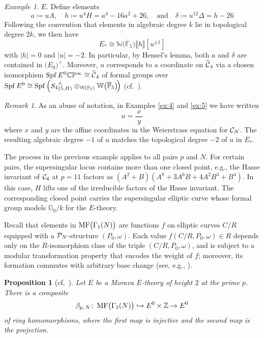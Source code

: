 \documentclass{gtpart}
\newtheorem{prop}[equation]{Proposition}
\theoremstyle{definition}
\theoremstyle{remark}
\newtheorem{rmk}[equation]{Remark}
\newtheorem{ex}[equation]{Example}
\def\co{\colon\thinspace}
\newcommand{\mb}[1]{\mathbb{#1}}
\newcommand{\Spf}{{\rm Spf\thinspace}}
\newcommand{\cF}{\overline {\mb F}}
\newcommand{\CC}{{\cal C}}
\newcommand{\CP}{{\cal P}}
\newcommand{\BC}{{\mb C}}
\newcommand{\BF}{{\mb F}}
\newcommand{\BG}{{\mb G}}
\newcommand{\BP}{{\mb P}}
\newcommand{\BW}{{\mb W}}
\newcommand{\BZ}{{\mb Z}}
\newcommand{\HCC}{\widehat{~\!\!\CC}}
\newcommand{\ad}{\text{and}}
\newcommand{\MF}{{\rm MF}}
\newcommand{\B}{\beta}
\renewcommand{\D}{\Delta}
\renewcommand{\d}{\delta}
\newcommand{\G}{\Gamma}
\newcommand{\ce}{\coloneqq}
\newcommand{\lb}{\llbracket}
\newcommand{\rb}{\rrbracket}
\renewcommand{\=}{\approx}
\renewcommand{\-}{\sim}
\numberwithin{equation}{section}
\begin{document}
\begin{ex}
 $E$.  Define elements 
 \[
  a \ce u A, \quad h \ce u^4 H = a^4 - 16 a^2 + 26, \quad \ad \quad \d \ce 
  u^{12} \D = h - 26 
 \]
 Following the convention that elements in algebraic degree $k$ lie in 
 topological degree $2 k$, we then have 
 \[
  E_* \cong \BW \big( \cF_5 \big) \lb h \rb [u^{\pm 1}] 
 \]
 with $|h| = 0$ and $|u| = -2$.  In particular, by Hensel's lemma, both $a$ and 
 $\d$ are contained in $\big( E_0 \big)^{\!\times}$.  Moreover, $u$ corresponds 
 to a coordinate on $\HCC_4$ via a chosen isomorphism 
 $\Spf E^0 \BC\BP^\infty \cong \HCC_4$ of formal groups over $\Spf E^0 \cong 
 \Spf\!\left( {S_4}^\wedge_{(5,H)} \otimes_{\BW(\BF_5)} 
 \BW \big( \cF_5 \big) \!\right)$ (cf.~\cite[Definition 1.2]{AHS01}).  
\end{ex}

\begin{rmk}
 \label{rmk:abuse}
 As an abuse of notation, in Examples \ref{ex:4} and \ref{ex:5} we have written 
 \[
  u = \frac{~\!x~\!}{y} 
 \]
 where $x$ and $y$ are the affine coordinates in the Weierstrass equation for 
 $\CC_N$.  The resulting algebraic degree $-1$ of $u$ matches the topological 
 degree $-2$ of $u$ in $E_*$.  
\end{rmk}

The process in the previous example applies to all pairs $p$ and $N$.  For 
certain pairs, the supersingular locus contains more than one closed point, 
e.g., the Hasse invariant of $\CC_4$ at $p = 11$ factors as 
$(A^2 + B) (A^8 + 3 A^6 B + 4 A^2 B^3 + B^4)$.  In this case, $H$ lifts one of 
the irreducible factors of the Hasse invariant.  The corresponding closed point 
carries the supersingular elliptic curve whose formal group models $\BG_0 / k$ 
for the $E$-theory.  

Recall that elements in $\MF\big(\G_1(N)\big)$ are functions $f$ on elliptic 
curves $C/R$ equipped with a $\CP_N$-structure $(P_0,\omega)$.  Each value 
$f(C/R, P_0, \omega) \in R$ depends only on the $R$-isomorphism class of the 
triple $(C/R, P_0, \omega)$, and is subject to a modular transformation property 
that encodes the weight of $f$; moreover, its formation commutes with arbitrary 
base change (see, e.g., \cite[Section 1.2]{padicprop}).  

\begin{prop}[cf.~{\cite[Lemma 6.3]{BOSS}}]
 \label{prop:mfe0}
 Let $E$ be a Morava $E$-theory of height $2$ at the prime $p$.  There is a 
 composite 
 \[
  \B_{p,\,N} \co \MF\big(\G_1(N)\big) \hookrightarrow E^0 \times \BZ \to E^0 
 \]
 of ring homomorphisms, where the first map is injective and the second map is 
 the projection.  
\end{prop}
\end{document}

